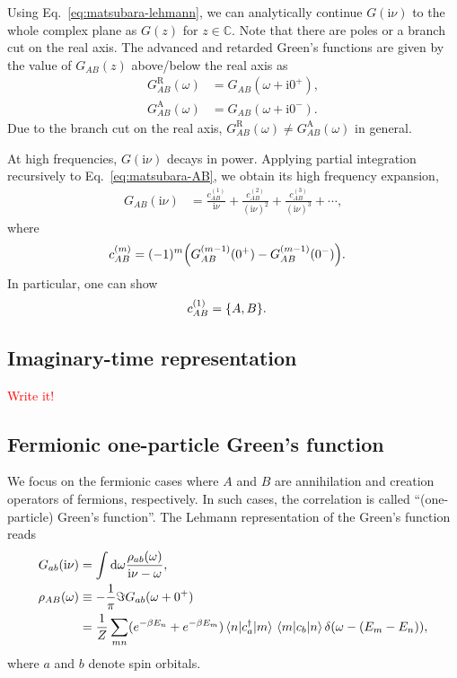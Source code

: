 \documentclass[submission, LectureNotes]{SciPost}
\newcommand\ii{\mathrm{i}}%
\newcommand\iv{\ii\nu}%
\begin{document}
Using Eq.~\eqref{eq:matsubara-lehmann},
we can analytically continue $G(\iv)$ to the whole complex plane as $G(z)$ for $z\in \mathbb{C}$.
Note that there are poles or a branch cut on the real axis.
The advanced and retarded Green's functions are given by the value of $G_{AB}(z)$ above/below the real axis as
\begin{align}
    G^\mathrm{R}_{AB}(\omega) &= G_{AB}(\omega+\ii 0^+),\\
    G^\mathrm{A}_{AB}(\omega) &= G_{AB}(\omega+\ii 0^-).
\end{align}
Due to the branch cut on the real axis, $G^\mathrm{R}_{AB}(\omega) \neq G^\mathrm{A}_{AB}(\omega)$ in general.

At high frequencies, $G(\iv)$ decays in power.
Applying partial integration recursively to Eq.~\eqref{eq:matsubara-AB},
we obtain its high frequency expansion,
\begin{align}
    G_{AB}(\iv) &= 
    \frac{c^{(1)}_{AB}}{\iv} +
    \frac{c^{(2)}_{AB}}{(\iv)^2} +
    \frac{c^{(3)}_{AB}}{(\iv)^3} + \cdots,
\end{align}
where
\begin{align}
    c^{(m)}_{AB} &= (-1)^{m} \qty(G_{AB}^{(m-1)}(0^+) - G_{AB}^{(m-1)}(0^-)).
\end{align}
In particular, one can show
\begin{align}
   c^{(1)}_{AB} &= \poissonbracket{A}{B}.
\end{align}

\subsection{Imaginary-time representation}
\textcolor{red}{Write it!}

\subsection{Fermionic one-particle Green's function}
We focus on the fermionic cases where $A$ and $B$ are annihilation and creation operators of fermions, respectively.
In such cases, the correlation is called ``(one-particle) Green's function''.
The Lehmann representation of the Green's function reads
\begin{align}
    G_{ab}(\iv) &= \int \dd \omega \frac{\rho_{ab}(\omega)}{\iv - \omega},\\
    \rho_{AB}(\omega) &\equiv -\frac{1}{\pi} \imaginary G_{ab}(\omega + 0^+)\\
    & = \frac{1}{Z}\sum_{mn}(e^{-\beta E_n} + e^{-\beta E_m})
    \mel{n}{c^\dagger_a}{m}\mel{m}{c_b}{n}
    \delta(\omega - (E_m-E_n)),\label{eq:matsubara-g-lehmann}
\end{align}
where $a$ and $b$ denote spin orbitals.
\end{document}
